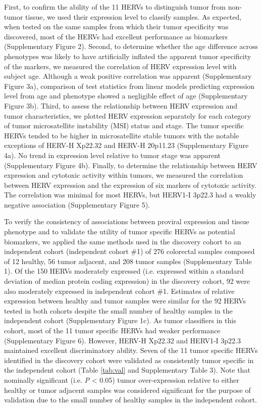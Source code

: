 First, to confirm the ability of the 11 HERVs to distinguish tumor from non-tumor tissue, we used their expression level to classify samples.
As expected, when tested on the same samples from which their tumor specificity was discovered, most of the HERVs had excellent performance as biomarkers (Supplementary Figure 2).
Second, to determine whether the age difference across phenotypes was likely to have artificially inflated the apparent tumor specificity of the markers, we measured the correlation of HERV expression level with subject age.
Although a weak positive correlation was apparent (Supplementary Figure 3a), comparison of test statistics from linear models predicting expression level from age and phenotype showed a negligible effect of age (Supplementary Figure 3b).
Third, to assess the relationship between HERV expression and tumor characteristics, we plotted HERV expression separately for each category of tumor microsatellite instability (MSI) status and stage.
The tumor specific HERVs tended to be higher in microsatellite stable tumors with the notable exceptions of HERV-H Xp22.32 and HERV-H 20p11.23 (Supplementary Figure 4a).
No trend in expression level relative to tumor stage was apparent (Supplementary Figure 4b).
Finally, to determine the relationship between HERV expression and cytotoxic activity within tumors, we measured the correlation between HERV expression and the expression of six markers of cytotoxic activity.
The correlation was minimal for most HERVs, but HERV1-I 3p22.3 had a weakly negative association (Supplementary Figure 5).

To verify the consistency of associations between proviral expression and tissue phenotype and to validate the utility of tumor specific HERVs as potential biomarkers, we applied the same methods used in the discovery cohort to an independent cohort (independent cohort \#1) of 276 colorectal samples composed of 12 healthy, 56 tumor adjacent, and 208 tumor samples (Supplementary Table 1).
Of the 150 HERVs moderately expressed (i.e. expressed within a standard deviation of median protein coding expression) in the discovery cohort, 92 were also moderately expressed in independent cohort \#1.
Estimates of relative expression between healthy and tumor samples were similar for the 92 HERVs tested in both cohorts despite the small number of healthy samples in the independent cohort (Supplementary Figure 1c).
As tumor classifiers in this cohort, most of the 11 tumor specific HERVs had weaker performance (Supplementary Figure 6).
However, HERV-H Xp22.32 and HERV1-I 3p22.3 maintained excellent discriminatory ability.
Seven of the 11 tumor specific HERVs identified in the discovery cohort were validated as consistently tumor specific in the independent cohort (Table \ref{tab:val} and Supplementary Table 3).
Note that nominally significant (i.e. \emph{P} < 0.05) tumor over-expression relative to either healthy or tumor adjacent samples was considered significant for the purpose of validation due to the small number of healthy samples in the independent cohort.

